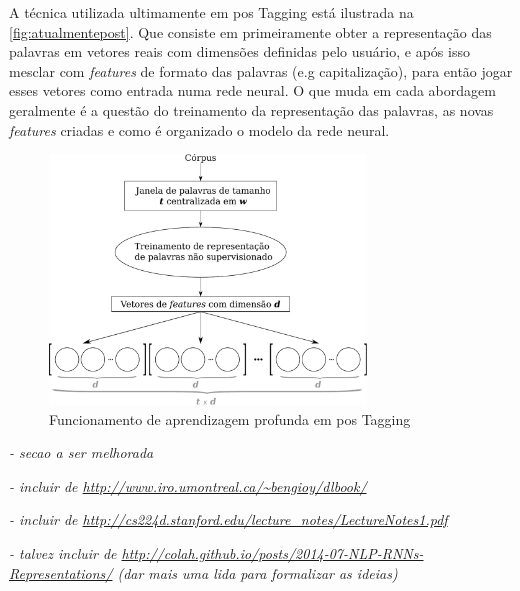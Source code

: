 A técnica utilizada ultimamente em \ac{pos} Tagging está ilustrada na \autoref{fig:atualmentepost}. Que consiste em primeiramente obter a representação das palavras em vetores reais com dimensões definidas pelo usuário, e após isso mesclar com \textit{features} de formato das palavras (e.g capitalização), para então jogar esses vetores como entrada numa rede neural. O que muda em cada abordagem geralmente é a questão do treinamento da representação das palavras, as novas \textit{features} criadas e como é organizado o modelo da rede neural.

\begin{figure}
\centering
\caption{Funcionamento de aprendizagem profunda em \ac{pos} Tagging} \label{fig:atualmentepost}
\includegraphics[width=0.75\textwidth]{img/deeplearningfunc}
\end{figure}


\textit{- secao a ser melhorada }

\textit{- incluir de \url{http://www.iro.umontreal.ca/~bengioy/dlbook/} }

\textit{- incluir de \url{http://cs224d.stanford.edu/lecture_notes/LectureNotes1.pdf} }

\textit{- talvez incluir de \url{http://colah.github.io/posts/2014-07-NLP-RNNs-Representations/} (dar mais uma lida para formalizar as ideias) }